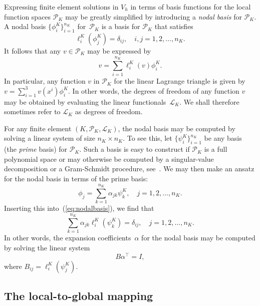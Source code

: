 Expressing finite element solutions in $V_h$ in terms of basis
functions for the local function spaces $\mathcal{P}_K$ may be greatly
simplified by introducing a \emph{nodal basis} for $\mathcal{P}_K$.  A
nodal basis $\{\phi^K_i\}_{i=1}^{n_K}$ for~$\mathcal{P}_K$ is a basis
for $\mathcal{P}_K$ that satisfies
\begin{equation} \label{eq:nodalbasis}
  \ell^K_i(\phi^K_j) = \delta_{ij}, \quad i, j = 1,2,\ldots, n_K.
\end{equation}
It follows that any $v \in \mathcal{P}_K$ may be expressed by
\begin{equation}
  v = \sum_{i=1}^{n_K} \ell^K_i(v) \phi^K_i.
\end{equation}
In particular, any function $v$ in $\mathcal{P}_K$ for the linear
Lagrange triangle is given by $v = \sum_{i=1}^3 v(x^i) \phi^K_i$. In
other words, the degrees of freedom of any function $v$ may be
obtained by evaluating the linear functionals~$\mathcal{L}_K$. We
shall therefore sometimes refer to $\mathcal{L}_K$ as degrees of
freedom.


For any finite element $(K, \mathcal{P}_K, \mathcal{L}_K)$, the nodal
basis may be computed by solving a linear system of size $n_K \times
n_K$. To see this, let $\{\psi^K_i\}_{i=1}^{n_K}$ be any basis (the
\emph{prime} basis) for $\mathcal{P}_K$. Such a basis is easy to
construct if $\mathcal{P}_K$ is a full polynomial space or may
otherwise be computed by a singular-value decomposition or a
Gram-Schmidt procedure, see~\cite{Kirby2004}. We may then make an
ansatz for the nodal basis in terms of the prime basis:
\begin{displaymath}
  \phi_j = \sum_{k=1}^{n_K} \alpha_{jk} \psi^K_k, \quad j = 1,2,\ldots,n_K.
\end{displaymath}
Inserting this into~(\ref{eq:nodalbasis}), we find that
\begin{displaymath}
  \sum_{k=1}^{n_K} \alpha_{jk} \ell^K_i(\psi^K_k) = \delta_{ij}, \quad j = 1,2,\ldots,n_K.
\end{displaymath}
In other words, the expansion coefficients~$\alpha$ for the nodal
basis may be computed by solving the linear system
\begin{displaymath}
  B \alpha^{\top} = I,
\end{displaymath}
where $B_{ij} = \ell^K_i(\psi^K_j)$.

\subsection{The local-to-global mapping}

